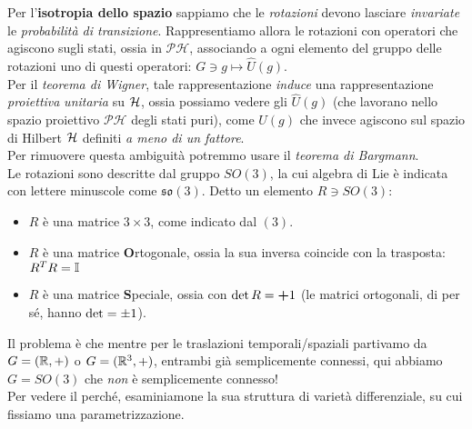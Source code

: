 \documentclass[../../FisicaTeorica.tex]{subfiles}
\begin{document}
Per l'\textbf{isotropia dello spazio} sappiamo che le \textit{rotazioni} devono lasciare \textit{invariate} le \textit{probabilità di transizione}. Rappresentiamo allora le rotazioni con operatori che agiscono sugli stati, ossia in $\mathcal{PH}$, associando a ogni elemento del gruppo delle rotazioni uno di questi operatori: $G \ni g \mapsto \hat{U}(g)$.\\
Per il \textit{teorema di Wigner}, tale rappresentazione \textit{induce} una rappresentazione \textit{proiettiva} \textit{unitaria} su $\mathcal{H}$, ossia possiamo vedere gli $\hat{U}(g)$ (che lavorano nello spazio proiettivo $\mathcal{PH}$ degli stati puri), come $U(g)$ che invece agiscono sul  spazio di Hilbert $\mathcal{H}$ definiti \textit{a meno di un fattore}.\\
Per rimuovere questa ambiguità potremmo usare il \textit{teorema di Bargmann}.\\
Le rotazioni sono descritte dal gruppo $SO(3)$, la cui algebra di Lie è indicata con lettere minuscole come $\mathfrak{so}(3)$. Detto un elemento $R\ni SO(3)$:
\begin{itemize}
\item $R$ è una matrice $3\times 3$, come indicato dal $(3)$.
\item $R$ è una matrice \textbf{O}rtogonale, ossia la sua inversa coincide con la trasposta: $R^T R = \mathbb{I}$
\item $R$ è una matrice \textbf{S}peciale, ossia con $\operatorname{det}R=\bm{+}1$ (le matrici ortogonali, di per sé, hanno $\operatorname{det} = \pm 1$).
\end{itemize}
Il problema è che mentre per le traslazioni temporali/spaziali partivamo da $G=(\mathbb{R},+)$ o $G=(\mathbb{R}^3,+)$, entrambi già semplicemente connessi, qui abbiamo $G=SO(3)$ che \textit{non} è semplicemente connesso!\\
Per vedere il perché, esaminiamone la sua struttura di varietà differenziale, su cui fissiamo una parametrizzazione.
\end{document}
